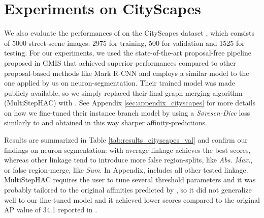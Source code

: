 \section{Experiments on CityScapes}\label{sec:cityscapes_exp}
We also evaluate the performances of \algname{} on the CityScapes dataset \cite{cordts2016cityscapes}, which consists of 5000 street-scene images: 2975 for training, 500 for validation and 1525 for testing.
For our experiments, we used the state-of-the-art proposal-free pipeline proposed in GMIS \cite{liu2018affinity} that achieved superior performances compared to other proposal-based methods like Mark R-CNN and employs a similar model to the one applied by us on neuron-segmentation.
Their trained model was made publicly available, so we simply replaced their final graph-merging algorithm (MultiStepHAC) with \algname{}. See Appendix \ref{sec:appendix_cityscapes} for more details on how we fine-tuned their instance branch model by using a \emph{S\o resen-Dice} loss similarly to \cite{wolf2018mutex} and obtained in this way sharper affinity-predictions.

Results are summarized in Table \ref{tab:results_cityscapes_val} and confirm our findings on neuron-segmentation: \algname{} with average linkage achieves the best scores, whereas other linkage tend to introduce more false region-splits, like \emph{Abs. Max.}, or false region-merge, like \emph{Sum}. In Appendix,  includes all other tested linkage. MultiStepHAC requires the user to tune several threshold parameters and it was probably tailored to the original affinities predicted by \cite{liu2018affinity}, so it did not generalize well to our fine-tuned model and it achieved lower scores compared to the original AP value of 34.1 reported in \cite{liu2018affinity}.  


